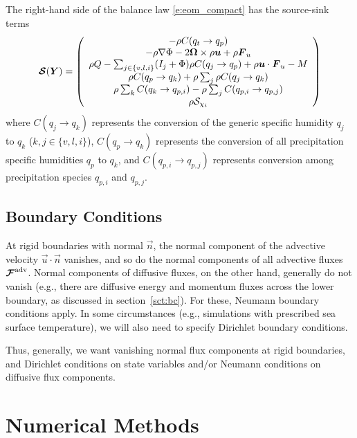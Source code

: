 \documentclass{report}
\begin{document}
The right-hand side of the balance law \eqref{e:eom_compact} has the source-sink terms
\begin{multline}
\boldsymbol{{\mathcal{S}}}(\boldsymbol{{Y}})= 
 \left( \begin{array}{c}
 -\rho C(q_t \rightarrow q_p) \\
  -\rho \nabla\Phi - 2 \boldsymbol{{\Omega}} \times \rho\boldsymbol{{u}}  + \rho \boldsymbol{{F}}_u \\
 \rho Q - \sum_{j\in\{v,l,i\}} (I_j + \Phi)  \rho C(q_j \rightarrow q_p) + \rho \boldsymbol{{u}} \cdot \boldsymbol{{F}}_u - M \\
\rho C(q_p \rightarrow q_k) + \rho \sum_j \rho C(q_j \rightarrow q_k) \\
\rho \sum_k C(q_k \rightarrow q_{p, i}) - \rho \sum_j C(q_{p, i} \rightarrow q_{p, j})\\
\rho \mathcal{S}_{\chi_i}
\end{array}
\right)
\label{eq:source}
\end{multline}
where $C(q_j \rightarrow q_k)$ represents the conversion of the generic specific humidity $q_j$ to $q_k$ ($k, j \in \{v, l, i\}$), $C(q_p \rightarrow q_k)$ represents the conversion of all precipitation specific humidities $q_p$ to $q_k$, and $C(q_{p, i} \rightarrow q_{p, j})$ represents conversion among precipitation species $q_{p, i}$ and $q_{p, j}$. 

\section{Boundary Conditions}

At rigid boundaries with normal $\vec{n}$, the normal component of the advective velocity $\vec{u} \cdot \vec{n}$ vanishes, and so do the normal components of all advective fluxes $\boldsymbol{{\mathcal{F}}}^{\mathrm{adv}}$. Normal components of diffusive fluxes, on the other hand, generally do not vanish (e.g., there are diffusive energy and momentum fluxes across the lower boundary, as discussed in section~\ref{sct:bc}). For these, Neumann boundary conditions apply. In some circumstances (e.g., simulations with prescribed sea surface temperature), we will also need to specify Dirichlet boundary conditions. 

Thus, generally, we want vanishing normal flux components at rigid boundaries, and Dirichlet conditions on state variables and/or Neumann conditions on diffusive flux components.

\chapter{Numerical Methods}\label{sec:numerical_methods}
\end{document}
